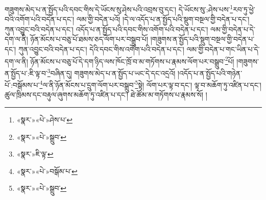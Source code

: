 གཟུགས་མེད་པ་ན་སྤྱོད་པའི་དབང་གིས་དེ་ཡོངས་སུ་ཤེས་པའི་འབྲས་བུ་དང་། དེ་ཡོངས་སུ་:ཤེས་པས་\footnote{«སྣར་»«པེ་»ཤེས་པ་}རབ་ཏུ་ཕྱེ་བའི་འགོག་པའི་བདེན་པ་དང་། ལམ་གྱི་བདེན་པའོ། །དེ་ལ་འདོད་པ་ན་སྤྱོད་པའི་སྡུག་བསྔལ་གྱི་བདེན་པ་དང་། ཀུན་འབྱུང་བའི་བདེན་པ་དང་། འདོད་པ་ན་སྤྱོད་པའི་དབང་གིས་འགོག་པའི་བདེན་པ་དང་། ལམ་གྱི་བདེན་པ་དེ་དག་ལ་ནི། ཉོན་མོངས་པ་བཅུ་པོ་ཐམས་ཅད་ལོག་པར་བསྒྲུབ་པོ། །གཟུགས་ན་སྤྱོད་པའི་སྡུག་བསྔལ་གྱི་བདེན་པ་དང་། ཀུན་འབྱུང་བའི་བདེན་པ་དང་། དེའི་དབང་གིས་འགོག་པའི་བདེན་པ་དང་། ལམ་གྱི་བདེན་པ་གང་ཡིན་པ་དེ་དག་ལ་ནི། ཉོན་མོངས་པ་བཅུ་པོ་དེ་དག་ཉིད་ལས་ཁོང་ཁྲོ་བ་མ་གཏོགས་པ་རྣམས་ལོག་པར་བསྒྲུབ་\footnote{«སྣར་»«པེ་»སྒྲུབ་}པོ། །གཟུགས་ན་སྤྱོད་པ་:ཇི་ལྟ་བ་\footnote{«སྣར་»ཇི་ལྟ་}བཞིན་དུ། གཟུགས་མེད་པ་ན་སྤྱོད་པ་ཡང་དེ་དང་འདྲའོ། །འདོད་པ་ན་སྤྱོད་པའི་གཉེན་པོ་:བསྒོམས་པ་\footnote{«སྣར་»«པེ་»བསྒོམ་པ་}ལ་ནི་ཉོན་མོངས་པ་དྲུག་ལོག་པར་བསྒྲུབ་\footnote{«སྣར་»«པེ་»སྒྲུབ་}སྟེ། ལོག་པར་ལྟ་བ་དང་། ལྟ་བ་མཆོག་ཏུ་འཛིན་པ་དང་། ཚུལ་ཁྲིམས་དང་བརྟུལ་ཞུགས་མཆོག་ཏུ་འཛིན་པ་དང་། ཐེ་ཚོམ་མ་གཏོགས་པ་རྣམས་སོ། །
